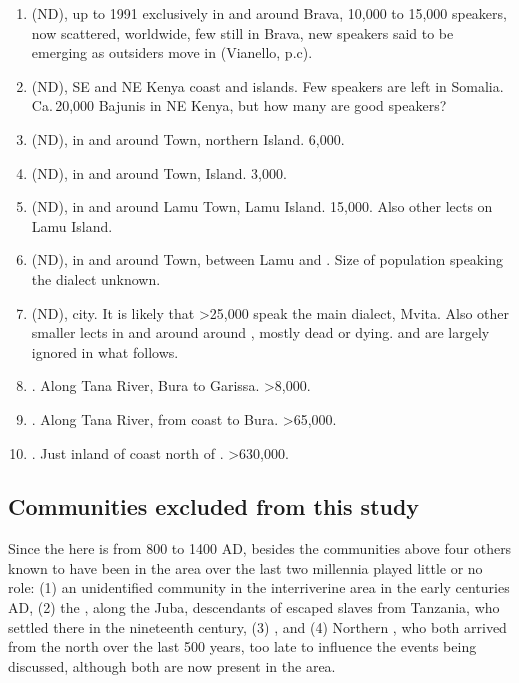\documentclass[output=paper
,newtxmath
,modfonts
,nonflat]{langsci/langscibook}
\begin{document}
\begin{enumerate}

\item {} (ND), up to 1991 exclusively in and around Brava, 10,000 to 15,000 speakers, now scattered, worldwide, few still in Brava, new speakers said to be emerging as outsiders move in (Vianello, p.c).

\item {} (ND), SE  and NE Kenya coast and islands. Few speakers are left in Somalia. Ca.\,20,000 Bajunis in NE Kenya, but how many are good speakers? 

\item {} (ND), in and around  Town, northern  Island. 6,000.

\item {} (ND), in and around  Town,  Island. 3,000.

\item {} (ND), in and around Lamu Town, Lamu Island. 15,000. Also other lects on Lamu Island.

\item {} (ND), in and around  Town, between Lamu and . Size of population  speaking the dialect unknown.

\item {} (ND),  city. It is likely that >25,000 speak the main dialect, Mvita. Also other smaller lects in and around around , mostly dead or dying.   and  are largely ignored in what follows.

\item {}. Along Tana River, Bura to Garissa. >8,000.

\item {}. Along Tana River, from coast to Bura. >65,000.

\item {}. Just inland of coast north of . >630,000.

\end{enumerate}

\subsection{Communities excluded from this study}\label{sec:nurse:2.4} 

Since the  here is from 800 to 1400 AD, besides the communities above four others known to have been in the area over the last two millennia played little or no role: (1) an unidentified  community in the interriverine area in the early centuries AD, (2) the , along the Juba, descendants of escaped slaves from Tanzania, who settled there in the nineteenth century, (3) , and (4) Northern , who both arrived from the north over the last 500 years, too late to influence the events being discussed, although both are now present in the area. 
\end{document}
